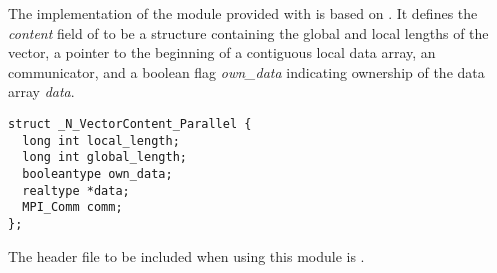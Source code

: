 %
The {\nvecp} implementation of the {\nvector} module provided with
{\sundials} is based on {\mpi}.  It defines the {\em content}
field of  to be a structure containing the global and local lengths 
of the vector, a pointer to the beginning of a contiguous local data array,
an {\mpi} communicator, and a boolean flag {\em own\_data} indicating ownership of 
the data array {\em data}.
\begin{verbatim} 
struct _N_VectorContent_Parallel {
  long int local_length;
  long int global_length;
  booleantype own_data;
  realtype *data;
  MPI_Comm comm;
};
\end{verbatim}

The header file to be included when using this module is .

